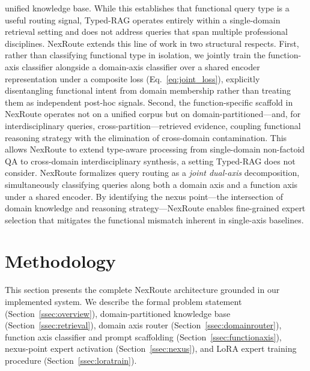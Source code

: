 \documentclass[a4paper,fleql]{cas-sc}
\begin{document}
unified knowledge base. While this establishes that functional query type is a
useful routing signal, Typed-RAG operates entirely within a single-domain
retrieval setting and does not address queries that span multiple professional
disciplines. NexRoute extends this line of work in two structural respects.
First, rather than classifying functional type in isolation, we jointly train
the function-axis classifier alongside a domain-axis classifier over a shared
encoder representation under a composite loss (Eq.~\ref{eq:joint_loss}),
explicitly disentangling functional intent from domain membership rather than
treating them as independent post-hoc signals. Second, the function-specific
scaffold in NexRoute operates not on a unified corpus but on
domain-partitioned---and, for interdisciplinary queries,
cross-partition---retrieved evidence, coupling functional reasoning strategy
with the elimination of cross-domain contamination. This allows NexRoute to
extend type-aware processing from single-domain non-factoid QA to
cross-domain interdisciplinary synthesis, a setting Typed-RAG does not
consider.
NexRoute formalizes query routing as a \emph{joint dual-axis} decomposition,
simultaneously classifying queries along both a domain axis and a function axis
under a shared encoder. By identifying the nexus point---the intersection of
domain knowledge and reasoning strategy---NexRoute enables fine-grained expert
selection that mitigates the functional mismatch inherent in single-axis
baselines.

\section{Methodology}
\label{sec:method}

This section presents the complete NexRoute architecture grounded in our
implemented system. We describe the formal problem statement
(Section~\ref{ssec:overview}), domain-partitioned knowledge base
(Section~\ref{ssec:retrieval}), domain axis router
(Section~\ref{ssec:domainrouter}), function axis classifier and prompt
scaffolding (Section~\ref{ssec:functionaxis}), nexus-point expert activation
(Section~\ref{ssec:nexus}), and LoRA expert training procedure
(Section~\ref{ssec:loratrain}).

\end{document}
